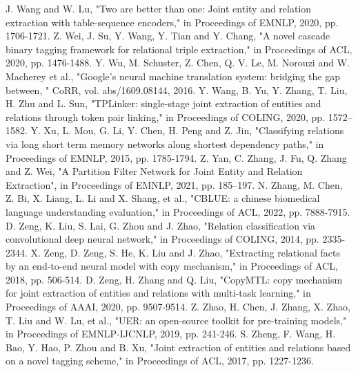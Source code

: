 \documentclass[conference]{IEEEtran}
\begin{document}
\begin{thebibliography}{00}
 J. Wang and W. Lu, "Two are better than one: Joint entity and relation extraction with table-sequence encoders," in Proceedings of EMNLP, 2020, pp. 1706-1721.
 Z. Wei, J. Su, Y. Wang, Y. Tian and Y. Chang, "A novel cascade binary tagging framework for relational triple extraction," in Proceedings of ACL, 2020, pp. 1476-1488.
 Y. Wu, M. Schuster, Z. Chen, Q. V. Le, M. Norouzi and W. Macherey et al., "Google's neural machine translation system: bridging the gap between, " CoRR, vol. abs/1609.08144, 2016.
 Y. Wang, B. Yu, Y. Zhang, T. Liu, H. Zhu and L. Sun, "TPLinker: single-stage joint extraction of entities and relations through token pair linking," in Proceedings of COLING, 2020, pp. 1572--1582.
 Y. Xu, L. Mou, G. Li, Y. Chen, H. Peng and Z. Jin, "Classifying relations via long short term memory networks along shortest dependency paths," in Proceedings of EMNLP, 2015, pp. 1785-1794.
 Z. Yan, C. Zhang, J. Fu, Q. Zhang and Z. Wei, "A Partition Filter Network for Joint Entity and Relation Extraction", in Proceedings of EMNLP, 2021, pp. 185--197.
 N. Zhang, M. Chen, Z. Bi, X. Liang, L. Li and X. Shang, et al., "CBLUE: a chinese biomedical language understanding evaluation," in Proceedings of ACL, 2022, pp. 7888-7915.
 D. Zeng, K. Liu, S. Lai, G. Zhou and J. Zhao, "Relation classification via convolutional deep neural network," in Proceedings of COLING, 2014, pp. 2335-2344.
 X. Zeng, D. Zeng, S. He, K. Liu and J. Zhao, "Extracting relational facts by an end-to-end neural model with copy mechanism," in Proceedings of ACL, 2018, pp. 506-514.
 D. Zeng, H. Zhang and Q. Liu, "CopyMTL: copy mechanism for joint extraction of entities and relations with multi-task learning," in Proceedings of AAAI, 2020, pp. 9507-9514.
 Z. Zhao, H. Chen, J. Zhang, X. Zhao, T. Liu and W. Lu, et al., "UER: an open-source toolkit for pre-training models," in Proceedings of EMNLP-IJCNLP, 2019, pp. 241-246.
 S. Zheng, F. Wang, H. Bao, Y. Hao, P. Zhou and B. Xu, "Joint extraction of entities and relations based on a novel tagging scheme," in Proceedings of ACL, 2017, pp. 1227-1236.
\end{thebibliography} 
\end{document}
